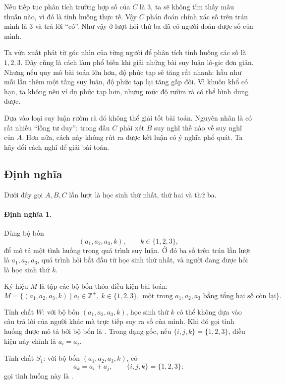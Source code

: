 \documentclass[11pt]{article}
\begin{document}
Nếu tiếp tục phân tích trường hợp số của \(C\) là \(3\), ta sẽ không tìm thấy
mâu thuẫn nào, vì đó là tình huống thực tế. Vậy \(C\) phán đoán chính xác số
trên trán mình là \(3\) và trả lời ``có''. Như vậy ở lượt hỏi thứ ba đã có
người đoán được số của mình.

Ta vừa xuất phát từ góc nhìn của từng người để phân tích tình huống các số là
\(1,2,3\). Đây cũng là cách làm phổ biến khi giải những bài suy luận lô-gic
đơn giản. Nhưng nếu quy mô bài toán lớn hơn, độ phức tạp sẽ tăng rất nhanh:
hầu như mỗi lần thêm một tầng suy luận, độ phức tạp lại tăng gấp đôi. Vì
khuôn khổ có hạn, ta không nêu ví dụ phức tạp hơn, nhưng mức độ rườm rà có
thể hình dung được.

Dựa vào loại suy luận rườm rà đó không thể giải tốt bài toán. Nguyên nhân là
có rất nhiều ``lồng tư duy'': trong đầu \(C\) phải xét \(B\) suy nghĩ thế nào
về suy nghĩ của \(A\). Hơn nữa, cách này không rút ra được kết luận có ý
nghĩa phổ quát. Ta hãy đổi cách nghĩ để giải bài toán.

\subsection*{Định nghĩa}

Dưới đây gọi \(A,B,C\) lần lượt là học sinh thứ nhất, thứ hai và thứ ba.

\paragraph{Định nghĩa 1.}
Dùng bộ bốn
\[
  (a_1,a_2,a_3,k),\qquad k\in\{1,2,3\},
\]
để mô tả một tình huống trong quá trình suy luận. Ở đó ba số trên trán lần
lượt là \(a_1,a_2,a_3\), quá trình hỏi bắt đầu từ học sinh thứ nhất, và người
đang được hỏi là học sinh thứ \(k\).

Ký hiệu \(M\) là tập các bộ bốn thỏa điều kiện bài toán:
\[
  M=\{(a_1,a_2,a_3,k)\mid a_i\in\mathbb Z^+,\ k\in\{1,2,3\},
  \text{ một trong }a_1,a_2,a_3\text{ bằng tổng hai số còn lại}\}.
\]

Tính chất \(W\): với bộ bốn \((a_1,a_2,a_3,k)\), học sinh thứ \(k\) có thể
không dựa vào câu trả lời của người khác mà trực tiếp suy ra số của mình. Khi
đó gọi tình huống được mô tả bởi bộ bốn là . Trong
dạng gốc, nếu \(\{i,j,k\}=\{1,2,3\}\), điều kiện này chính là \(a_i=a_j\).

Tính chất \(S_1\): với bộ bốn \((a_1,a_2,a_3,k)\), có
\[
  a_k=a_i+a_j,\qquad \{i,j,k\}=\{1,2,3\};
\]
gọi tình huống này là .
\end{document}
